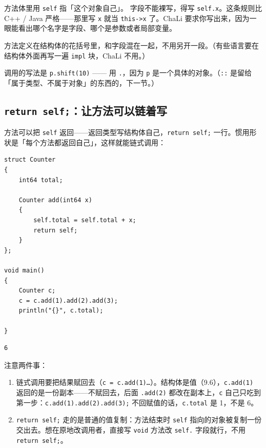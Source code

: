方法体里用 \texttt{self} 指「这个对象自己」。 字段不能裸写，得写 \texttt{self.\allowbreak{}x}。这条规则比 C++ / Java 严格——那里写 \texttt{x} 就当 \texttt{this->\allowbreak{}x} 了。ChaLi 要求你写出来，因为一眼能看出哪个名字是字段、哪个是参数或者局部变量。

方法定义在结构体的花括号里，和字段混在一起，不用另开一段。（有些语言要在结构体外面再写一遍 \texttt{impl} 块，ChaLi 不用。）

调用的写法是 \texttt{p.\allowbreak{}shift(\allowbreak{}10)\allowbreak{}} —— 用 \texttt{.\allowbreak{}}，因为 \texttt{p} 是一个具体的对象。（\texttt{:\allowbreak{}:\allowbreak{}} 是留给「属于类型、不属于对象」的东西的，下一节。）

\subsection*{\texttt{return self;}：让方法可以链着写}

方法可以把 \texttt{self} 返回——返回类型写结构体自己，\texttt{return self;} 一行。惯用形状是「每个方法都返回自己」，这样就能链式调用：

\par
\medskip
\begin{lstlisting}[style=chali]
struct Counter
{
    int64 total;

    Counter add(int64 x)
    {
        self.total = self.total + x;
        return self;
    }
};

void main()
{
    Counter c;
    c = c.add(1).add(2).add(3);
    println("{}", c.total);

}
\end{lstlisting}
\par
\medskip

\par
\medskip
\begin{lstlisting}[style=out]
6
\end{lstlisting}
\par
\medskip

注意两件事：

\begin{enumerate}

\item 链式调用要把结果赋回去（\texttt{c =\allowbreak{} c.\allowbreak{}add(\allowbreak{}1)\allowbreak{}…}）。结构体是值（9.6），\texttt{c.\allowbreak{}add(\allowbreak{}1)\allowbreak{}} 返回的是一份副本——不赋回去，后面 \texttt{.\allowbreak{}add(\allowbreak{}2)\allowbreak{}} 都改在副本上，\texttt{c} 自己只吃到第一步：\texttt{c.\allowbreak{}add(\allowbreak{}1)\allowbreak{}.\allowbreak{}add(\allowbreak{}2)\allowbreak{}.\allowbreak{}add(\allowbreak{}3)\allowbreak{};} 不回赋值的话，\texttt{c.\allowbreak{}total} 是 1，不是 6。

\item \texttt{return self;} 走的是普通的值复制：方法结束时 \texttt{self} 指向的对象被复制一份交出去。想在原地改调用者，直接写 \texttt{void} 方法改 \texttt{self.\allowbreak{}} 字段就行，不用 \texttt{return self;}。

\end{enumerate}

